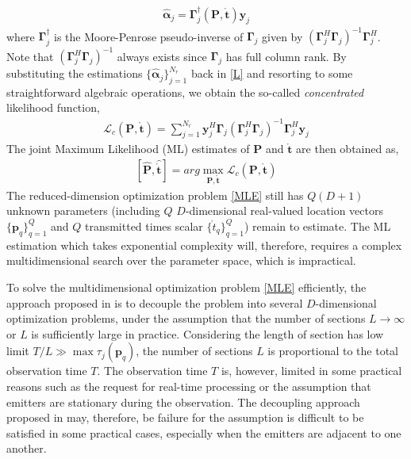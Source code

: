 \documentclass[review]{elsarticle}
\begin{document}
\begin{align}
    \hat{\boldsymbol{\alpha}}_j=\boldsymbol{\Gamma}_{j}^\dagger(\boldsymbol{P},\mathring{\boldsymbol{t}})\boldsymbol{y}_j
\end{align}
where $\boldsymbol{\Gamma}_{j}^\dagger$ is the Moore-Penrose pseudo-inverse of $\boldsymbol{\Gamma}_{j}$ given by $(\boldsymbol{\Gamma}_{j}^H\boldsymbol{\Gamma}_{j})^{-1}\boldsymbol{\Gamma}_{j}^H$. Note that $(\boldsymbol{\Gamma}_{j}^H\boldsymbol{\Gamma}_{j})^{-1}$ always exists since $\boldsymbol{\Gamma}_{j}$ has full column rank. By substituting the estimations $\lbrace \hat{\boldsymbol{\alpha}}_j\rbrace _{j=1}^{N_r}$ back in \eqref{L} and resorting to some straightforward algebraic operations, we obtain the so-called \emph{concentrated} likelihood function,
\begin{align}\label{CLF}
    \mathcal{L}_c(\boldsymbol{P},\mathring{\boldsymbol{t}})=\sum_{j=1}^{N_r}\boldsymbol{y}_j^H\boldsymbol{\Gamma}_{j}(\boldsymbol{\Gamma}_{j}^H\boldsymbol{\Gamma}_{j})^{-1}\boldsymbol{\Gamma}_{j}^H\boldsymbol{y}_j
\end{align}
The joint Maximum Likelihood (ML) estimates of $\boldsymbol{P}$ and $\mathring{\boldsymbol{t}}$ are then obtained as,
\begin{align}\label{MLE}
    [\hat{\boldsymbol{P}},\hat{\mathring{\boldsymbol{t}}}]=arg \max_{\boldsymbol{P},\mathring{\boldsymbol{t}}} \mathcal{L}_c(\boldsymbol{P},\mathring{\boldsymbol{t}})
\end{align}
The reduced-dimension optimization problem \eqref{MLE} still has $Q(D+1)$ unknown parameters (including $Q$ $D$-dimensional real-valued location vectors $\lbrace \boldsymbol{p}_q\rbrace_{q=1}^Q$ and $Q$ transmitted times scalar $\lbrace \mathring{t}_q\rbrace_{q=1}^Q$) remain to estimate. The ML estimation which takes exponential complexity will, therefore, requires a complex multidimensional search over the parameter space, which is impractical.

To solve the multidimensional optimization problem \eqref{MLE} efficiently, the approach proposed in \cite{DPD2005} is to decouple the problem into several $D$-dimensional optimization problems, under the assumption that the number of sections $L\to \infty$ or $L$ is sufficiently large in practice. Considering the length of section has low limit $T/L\gg \max{\tau_j(\boldsymbol{p}_q)}$, the number of sections $L$ is proportional to the total observation time $T$. The observation time $T$ is, however, limited in some practical reasons such as the request for real-time processing or the assumption that emitters are stationary during the observation. The decoupling approach proposed in \cite{DPD2005} may, therefore, be failure for the assumption is difficult to be satisfied in some practical cases, especially when the emitters are adjacent to one another.
\end{document}

